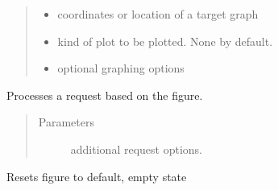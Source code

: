 \documentclass[letterpaper,10pt,english]{sphinxmanual}
\begin{document}
\begin{fulllineitems}
\begin{fulllineitems}
\begin{quote}
\begin{description}
\begin{itemize}
\item {} 
 \textendash{} coordinates or location of a target graph

\item {} 
 \textendash{} kind of plot to be plotted. None by default.

\item {} 
 \textendash{} optional graphing options

\end{itemize}

\end{description}\end{quote}

\end{fulllineitems}


\begin{fulllineitems}
\label{\detokenize{dalio.external:dalio.external.image.Figure.request}}
Processes a request based on the figure.
\begin{quote}\begin{description}
\item[{Parameters}] \leavevmode
{} \textendash{} additional request options.

\end{description}\end{quote}

\end{fulllineitems}


\begin{fulllineitems}
\label{\detokenize{dalio.external:dalio.external.image.Figure.reset}}
Resets figure to default, empty state

\end{fulllineitems}


\end{fulllineitems}

\end{document}
